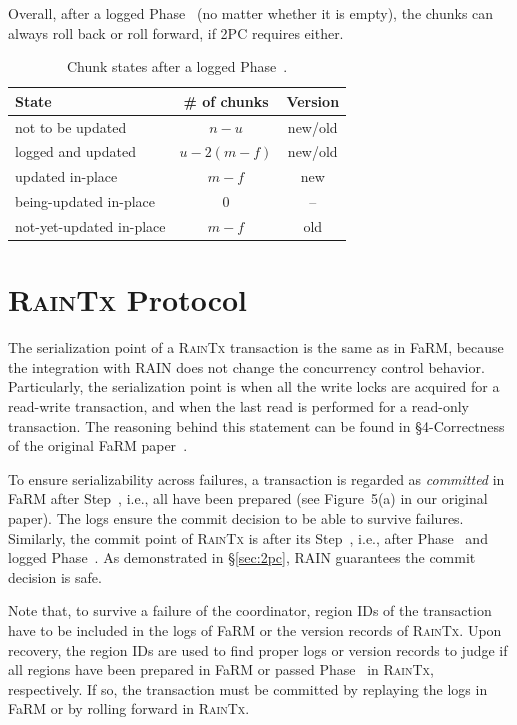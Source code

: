\documentclass[letterpaper,10pt,twocolumn]{article}
\begin{document}
Overall, after a logged Phase~ (no matter whether it is empty), the
chunks can always roll back or roll forward, if 2PC requires either.

\begin{table}[!ht]
\centering
\begin{tabular}{l|c|c}
\hline
State & \# of chunks & Version \\
\hline
not to be updated & $n-u$ & new/old \\
logged and updated & $u - 2(m-f)$ & new/old \\
updated in-place & $m-f$ & new \\
being-updated in-place & $0$ & -- \\
not-yet-updated in-place & $m-f$ & old \\
\hline
\end{tabular}
\caption{Chunk states after a logged Phase~.}
\label{tab:states-2}
\end{table}



\section{\textsc{RainTx} Protocol}
\label{sec:raintx}

The serialization point of a \textsc{RainTx} transaction is the same as in FaRM, because the integration with RAIN does not change the concurrency control behavior.
Particularly, the serialization point is when all the write locks are acquired for a read-write transaction, and when the last read is performed for a read-only transaction.
The reasoning behind this statement can be found in \S4-Correctness of the original FaRM paper~\cite{Dragojevic:2015:NCD:2815400.2815425}.

To ensure serializability across failures, a transaction is regarded as \emph{committed} in FaRM after Step~, i.e., all have been prepared (see Figure~5(a) in our original paper).
The logs ensure the commit decision to be able to survive failures.
Similarly, the commit point of \textsc{RainTx} is after its Step~, i.e., after Phase~ and logged Phase~.
As demonstrated in \S\ref{sec:2pc}, RAIN guarantees the commit decision is safe.

Note that, to survive a failure of the coordinator, region IDs of the transaction have to be included in the logs of FaRM or the version records of \textsc{RainTx}.
Upon recovery, the region IDs are used to find proper logs or version records to judge if all regions have been prepared in FaRM or passed Phase~ in \textsc{RainTx}, respectively.
If so, the transaction must be committed by replaying the logs in FaRM or by rolling forward in \textsc{RainTx}.
\end{document}
